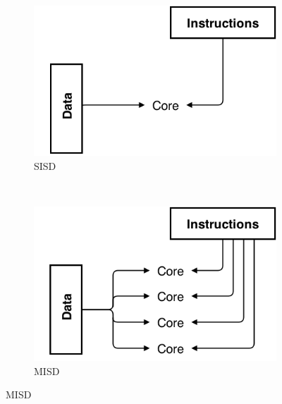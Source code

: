 \documentclass[10pt,a4paper]{report}
\begin{document}
\begin{figure}
        \centering
        \begin{subfigure}[b]{0.4\textwidth}
                \includegraphics[width=\textwidth]{SISD}
                \caption{SISD}
                \label{fig:SISD}
        \end{subfigure}%
        ~
        \begin{subfigure}[b]{0.4\textwidth}
                \includegraphics[width=\textwidth]{MISD}
                \caption{MISD}
                \label{fig:MISD}
        \end{subfigure}


\end{figure}
\end{document}
